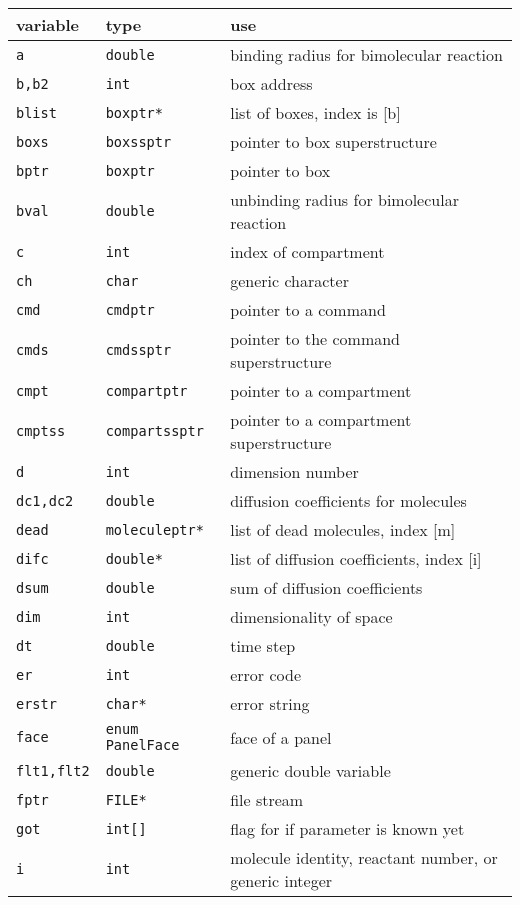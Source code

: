 \documentclass {book}
\newcommand {\ttt} {\texttt}
\begin{document}
\begin{longtable}[c]{lll}
variable & type & use\\
\hline
\ttt{a} & \ttt{double} & binding radius for bimolecular reaction\\
\ttt{b,b2} & \ttt{int} & box address\\
\ttt{blist} & \ttt{boxptr*} & list of boxes, index is [b]\\
\ttt{boxs} & \ttt{boxssptr} & pointer to box superstructure\\
\ttt{bptr} & \ttt{boxptr} & pointer to box\\
\ttt{bval} & \ttt{double} & unbinding radius for bimolecular reaction\\
\ttt{c} & \ttt{int} & index of compartment\\
\ttt{ch} & \ttt{char} & generic character\\
\ttt{cmd} & \ttt{cmdptr} & pointer to a command\\
\ttt{cmds} & \ttt{cmdssptr} & pointer to the command superstructure\\
\ttt{cmpt} & \ttt{compartptr} & pointer to a compartment\\
\ttt{cmptss} & \ttt{compartssptr} & pointer to a compartment superstructure\\
\ttt{d} & \ttt{int} & dimension number\\
\ttt{dc1,dc2} & \ttt{double} & diffusion coefficients for molecules\\
\ttt{dead} & \ttt{moleculeptr*} & list of dead molecules, index [m]\\
\ttt{difc} & \ttt{double*} & list of diffusion coefficients, index [i]\\
\ttt{dsum} & \ttt{double} & sum of diffusion coefficients\\
\ttt{dim} & \ttt{int} & dimensionality of space\\
\ttt{dt} & \ttt{double} & time step\\
\ttt{er} & \ttt{int} & error code\\
\ttt{erstr} & \ttt{char*} & error string\\
\ttt{face} & \ttt{enum PanelFace} & face of a panel\\
\ttt{flt1,flt2} & \ttt{double} & generic double variable\\
\ttt{fptr} & \ttt{FILE*} & file stream\\
\ttt{got} & \ttt{int[]} & flag for if parameter is known yet\\
\ttt{i} & \ttt{int} & molecule identity, reactant number, or generic integer\\

\end{longtable}
\end{document}
